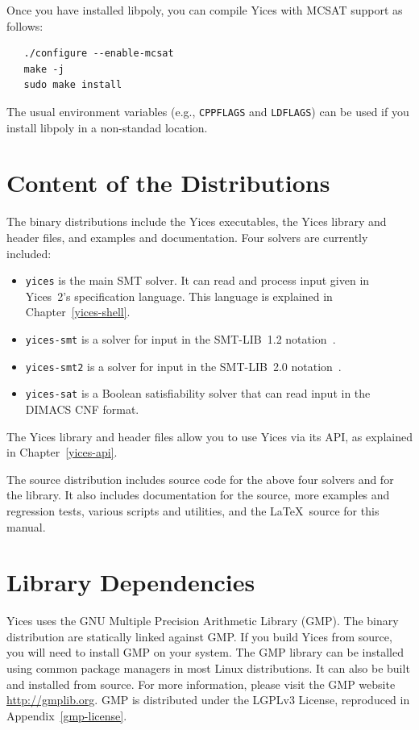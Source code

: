 \documentclass[11pt,twoside,fleqn,openright,titlepage]{cslreport}
\begin{document}
Once you have installed libpoly, you can compile Yices with MCSAT
support as follows:
\begin{small}
\begin{verbatim}
   ./configure --enable-mcsat
   make -j
   sudo make install
\end{verbatim}
\end{small}
The usual environment variables (e.g., \texttt{CPPFLAGS} and
\texttt{LDFLAGS}) can be used if you install libpoly in a non-standad
location.


\section{Content of the Distributions}

The binary distributions include the Yices executables, the Yices
library and header files, and examples and documentation.  Four
solvers are currently included:
\begin{itemize}
\item \texttt{yices} is  the main SMT solver. It  can read and process
  input given  in Yices~2's  specification language. This  language is
  explained in Chapter~\ref{yices-shell}.

\item  \texttt{yices-smt} is  a solver  for input  in  the SMT-LIB~1.2
  notation~\cite{SMTLIB12:2006}.

\item \texttt{yices-smt2} is a solver for input in the SMT-LIB~2.0
  notation~\cite{SMTLIB20:2012}.

\item \texttt{yices-sat}  is a Boolean satisfiability  solver that can
  read input in the DIMACS CNF format.
\end{itemize}
The Yices library and header files allow you to use Yices via its
API, as explained in Chapter~\ref{yices-api}.

The source distribution includes source code for the above four
solvers and for the library. It also includes documentation for the
source, more examples and regression tests, various scripts and
utilities, and the \LaTeX\ source for this manual.


\section{Library Dependencies}

Yices uses the GNU Multiple Precision Arithmetic Library (GMP).  The
binary distribution are statically linked against GMP. If you build
Yices from source, you will need to install GMP on your system.  The
GMP library can be installed using common package managers in most
Linux distributions. It can also be built and installed from
source. For more information, please visit the GMP website
\url{http://gmplib.org}. GMP is distributed under the LGPLv3 License,
reproduced in Appendix~\ref{gmp-license}.
\end{document}
